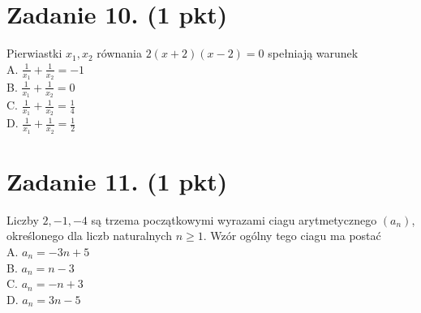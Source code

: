 \documentclass[10pt]{article}
\begin{document}
\section*{Zadanie 10. (1 pkt)}
Pierwiastki \(x_{1}, x_{2}\) równania \(2(x+2)(x-2)=0\) spełniają warunek\\
A. \(\frac{1}{x_{1}}+\frac{1}{x_{2}}=-1\)\\
B. \(\frac{1}{x_{1}}+\frac{1}{x_{2}}=0\)\\
C. \(\frac{1}{x_{1}}+\frac{1}{x_{2}}=\frac{1}{4}\)\\
D. \(\frac{1}{x_{1}}+\frac{1}{x_{2}}=\frac{1}{2}\)

\section*{Zadanie 11. (1 pkt)}
Liczby \(2,-1,-4\) są trzema początkowymi wyrazami ciagu arytmetycznego \(\left(a_{n}\right)\), określonego dla liczb naturalnych \(n \geq 1\). Wzór ogólny tego ciagu ma postać\\
A. \(a_{n}=-3 n+5\)\\
B. \(a_{n}=n-3\)\\
C. \(a_{n}=-n+3\)\\
D. \(a_{n}=3 n-5\)
\end{document}
